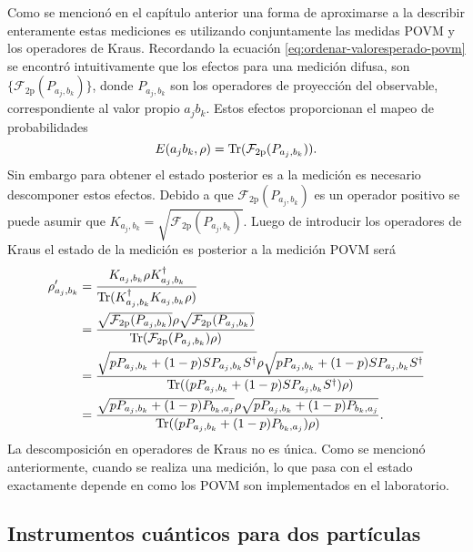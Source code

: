 Como se mencionó en el capítulo anterior una forma de aproximarse a la describir enteramente estas mediciones es utilizando conjuntamente las medidas POVM y los operadores de Kraus. Recordando la ecuación {\eqref{eq:ordenar-valoresperado-povm}} se encontró intuitivamente que los efectos para una medición difusa, son $\{\mathcal{F}_{2\text{p}}({P_{a_j,b_k}})\}$, donde $P_{a_j,b_k}$ son los operadores de proyección del observable, correspondiente al valor propio ${a_j b_k}$. Estos efectos proporcionan el mapeo de probabilidades\begin{equation}\label{eq:mapeo-probabilidades-2p}
    E(a_j b_k, \rho)= {\rm Tr}(\mathcal{F}_{2\text{p}}({P_{a_j,b_k}})).
    \end{equation} Sin embargo para obtener el estado posterior es a la medición es necesario descomponer estos efectos. Debido a que $\mathcal{F}_{2\text{p}}({P_{a_j,b_k}})$ es un operador positivo se puede asumir que
    $K_{a_j,b_k}=\sqrt{\mathcal{F}_{2\text{p}}({P_{a_j,b_k}})}$. Luego de introducir los operadores de Kraus el
    estado de la medición es posterior a la medición POVM será
    \begin{equation}\label{eq:estado-posterior-povm1-2p}\begin{split}\rho'_{a_j,b_k}&=\dfrac{K_{a_j,b_k} \rho
    K_{a_j,b_k}^\dagger}{{\rm Tr}(K_{a_j,b_k}^\dagger K_{a_j,b_k} \rho)}\\
    &=\dfrac{\sqrt{\mathcal{F}_{2\text{p}}(P_{a_j,b_k})} \rho
    \sqrt{\mathcal{F}_{2\text{p}}({P_{a_j,b_k}})}}{{\rm Tr}(\mathcal{F}_{2\text{p}}({P_{a_j,b_k}}) \rho)}\\
    &=\dfrac{\sqrt{p P_{a_j,b_k}+(1-p)SP_{a_j,b_k}S^\dagger}\rho\sqrt{p P_{a_j,b_k}+(1-p)SP_{a_j,b_k}S^\dagger}}{{\rm Tr}((p P_{a_j,b_k}+(1-p)SP_{a_j,b_k}S^\dagger) \rho)}\\
    &=\dfrac{\sqrt{p P_{a_j,b_k}+(1-p)P_{b_k,a_j}}\rho\sqrt{p P_{a_j,b_k}+(1-p)P_{b_k,a_j}} }{{\rm Tr}((p P_{a_j,b_k}+(1-p)P_{b_k,a_j}) \rho)}.
    \end{split}\end{equation}La descomposición en operadores de Kraus
    no es única. Como se mencionó anteriormente, cuando se realiza una medición, lo que pasa con el estado exactamente depende en como los POVM son implementados en el laboratorio.





\subsection{Instrumentos cuánticos para dos partículas} %

